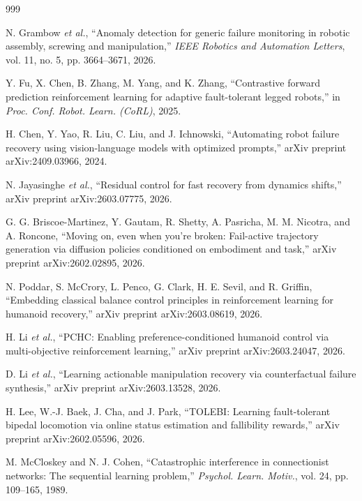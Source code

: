 ﻿\documentclass[11pt,a4paper]{article}
\begin{document}
\begin{thebibliography}{999}

N. Grambow \textit{et al.}, ``Anomaly detection for generic failure monitoring in robotic assembly, screwing and manipulation,'' \textit{IEEE Robotics and Automation Letters}, vol. 11, no. 5, pp. 3664--3671, 2026.

Y. Fu, X. Chen, B. Zhang, M. Yang, and K. Zhang, ``Contrastive forward prediction reinforcement learning for adaptive fault-tolerant legged robots,'' in \textit{Proc. Conf. Robot. Learn. (CoRL)}, 2025.

H. Chen, Y. Yao, R. Liu, C. Liu, and J. Ichnowski, ``Automating robot failure recovery using vision-language models with optimized prompts,'' arXiv preprint arXiv:2409.03966, 2024.

N. Jayasinghe \textit{et al.}, ``Residual control for fast recovery from dynamics shifts,'' arXiv preprint arXiv:2603.07775, 2026.

G. G. Briscoe-Martinez, Y. Gautam, R. Shetty, A. Pasricha, M. M. Nicotra, and A. Roncone, ``Moving on, even when you're broken: Fail-active trajectory generation via diffusion policies conditioned on embodiment and task,'' arXiv preprint arXiv:2602.02895, 2026.

N. Poddar, S. McCrory, L. Penco, G. Clark, H. E. Sevil, and R. Griffin, ``Embedding classical balance control principles in reinforcement learning for humanoid recovery,'' arXiv preprint arXiv:2603.08619, 2026.

H. Li \textit{et al.}, ``{PCHC}: Enabling preference-conditioned humanoid control via multi-objective reinforcement learning,'' arXiv preprint arXiv:2603.24047, 2026.

D. Li \textit{et al.}, ``Learning actionable manipulation recovery via counterfactual failure synthesis,'' arXiv preprint arXiv:2603.13528, 2026.

H. Lee, W.-J. Baek, J. Cha, and J. Park, ``{TOLEBI}: Learning fault-tolerant bipedal locomotion via online status estimation and fallibility rewards,'' arXiv preprint arXiv:2602.05596, 2026.

M. McCloskey and N. J. Cohen, ``Catastrophic interference in connectionist networks: The sequential learning problem,'' \textit{Psychol. Learn. Motiv.}, vol. 24, pp. 109--165, 1989.


\end{thebibliography}
\end{document}

